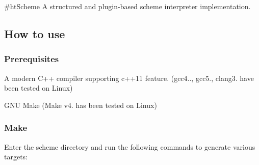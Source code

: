 \#ht\+Scheme A structured and plugin-\/based scheme interpreter implementation.

\subsection*{How to use}

\subsubsection*{Prerequisites}


\begin{DoxyItemize}
\item A modern C++ compiler supporting c++11 feature. (gcc4.., gcc5., clang3. have been tested on Linux)
\item G\+N\+U Make (Make v4. has been tested on Linux)
\end{DoxyItemize}

\subsubsection*{Make}

Enter the {\ttfamily scheme} directory and run the following commands to generate various targets\+:

